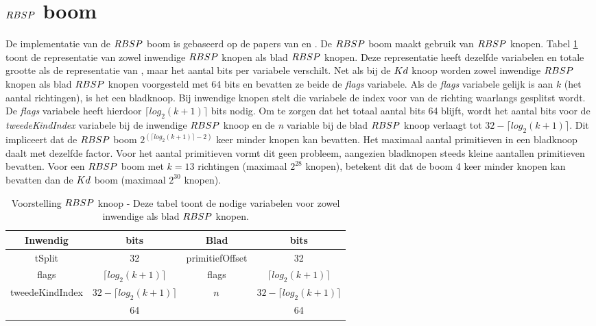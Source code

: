 \section{$\symRBSP$ boom}
\label{sec:h4-rbsp}
De implementatie van de $\symRBSP$ boom is gebaseerd op de papers van \authorKammaje{} \cite{Kammaje} en \authorBudge{} \cite{Budge}.
De $\symRBSP$ boom maakt gebruik van $\symRBSP$ knopen. 
Tabel \ref{tab:voorstelling-rbsp-knoop} toont de representatie van zowel inwendige $\symRBSP$ knopen als blad $\symRBSP$ knopen.
Deze representatie heeft dezelfde variabelen en totale grootte als de representatie van \authorKammaje{} \cite{Kammaje}, maar het aantal bits per variabele verschilt.
Net als bij de $Kd$ knoop worden zowel inwendige $\symRBSP$ knopen als blad $\symRBSP$ knopen voorgesteld met 64 bits en bevatten ze beide de \textit{flags} variabele.
Als de \textit{flags} variabele gelijk is aan $k$ (het aantal richtingen), is het een bladknoop.
Bij inwendige knopen stelt die variabele de index voor van de richting waarlangs gesplitst wordt.
De \textit{flags} variabele heeft hierdoor $\lceil log_2(k+1) \rceil$ bits nodig.
Om te zorgen dat het totaal aantal bits 64 blijft, wordt het aantal bits voor de \textit{tweedeKindIndex} variabele bij de inwendige $\symRBSP$ knoop en de \textit{n}  variable bij de blad $\symRBSP$ knoop verlaagt tot $32 - \lceil log_2(k+1) \rceil$.
Dit impliceert dat de $\symRBSP$ boom $2^{(\lceil log_2(k+1) \rceil - 2)}$ keer minder knopen kan bevatten.
Het maximaal aantal primitieven in een bladknoop daalt met dezelfde factor.
Voor het aantal primitieven vormt dit geen probleem, aangezien bladknopen steeds kleine aantallen primitieven bevatten.
Voor een $\symRBSP$ boom met $k = 13$ richtingen (maximaal $2^{28}$ knopen), betekent dit dat de boom 4 keer minder knopen kan bevatten dan de $Kd$ boom (maximaal $2^{30}$ knopen). \\
\begin{table}
        \centering
        \begin{tabular}{@{}|c|c|c|c|@{}} \toprule      
        Inwendig & bits & Blad & bits \\ \midrule
        tSplit & 32 & primitiefOffset & 32 \\
        flags  & $\lceil log_2(k+1) \rceil$  &  flags   & $\lceil log_2(k+1) \rceil$   \\
        tweedeKindIndex & $32 - \lceil log_2(k+1) \rceil$ & $n$ &  $32 - \lceil log_2(k+1) \rceil$ \\ \hline \hline
        & 64 & & 64    \\ \bottomrule
        \end{tabular}
    \caption[Voorstelling $\symRBSP$ knoop]{Voorstelling $\symRBSP$ knoop - \small Deze tabel toont de nodige variabelen voor zowel inwendige als blad $\symRBSP$ knopen.}
    \label{tab:voorstelling-rbsp-knoop}    
\end{table}   

